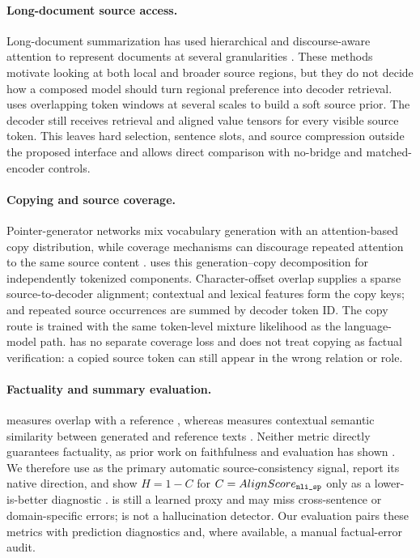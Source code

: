 \paragraph{Long-document source access.}
Long-document summarization has used hierarchical and discourse-aware attention to represent documents at several granularities \citep{cohan2018discourse}. These methods motivate looking at both local and broader source regions, but they do not decide how a composed model should turn regional preference into decoder retrieval. \AFMR uses overlapping token windows at several scales to build a soft source prior. The decoder still receives retrieval and aligned value tensors for every visible source token. This leaves hard selection, sentence slots, and source compression outside the proposed interface and allows direct comparison with no-bridge and matched-encoder controls.

\paragraph{Copying and source coverage.}
Pointer-generator networks mix vocabulary generation with an attention-based copy distribution, while coverage mechanisms can discourage repeated attention to the same source content \citep{see2017get}. \AFMR uses this generation--copy decomposition for independently tokenized components. Character-offset overlap supplies a sparse source-to-decoder alignment; contextual and lexical features form the copy keys; and repeated source occurrences are summed by decoder token ID. The copy route is trained with the same token-level mixture likelihood as the language-model path. \AFMR has no separate coverage loss and does not treat copying as factual verification: a copied source token can still appear in the wrong relation or role.

\paragraph{Factuality and summary evaluation.}
\Rouge measures overlap with a reference \citep{lin2004rouge}, whereas \BERTScore measures contextual semantic similarity between generated and reference texts \citep{zhang2020bertscore}. Neither metric directly guarantees factuality, as prior work on faithfulness and evaluation has shown \citep{maynez2020faithfulness,fabbri2021summeval}. We therefore use \AlignScore as the primary automatic source-consistency signal, report its native direction, and show $H=1-C$ for $C=AlignScore_{\texttt{nli\_sp}}$ only as a lower-is-better diagnostic \citep{zha-etal-2023-alignscore}. \AlignScore is still a learned proxy and may miss cross-sentence or domain-specific errors; \BERTScore is not a hallucination detector. Our evaluation pairs these metrics with prediction diagnostics and, where available, a manual factual-error audit.

